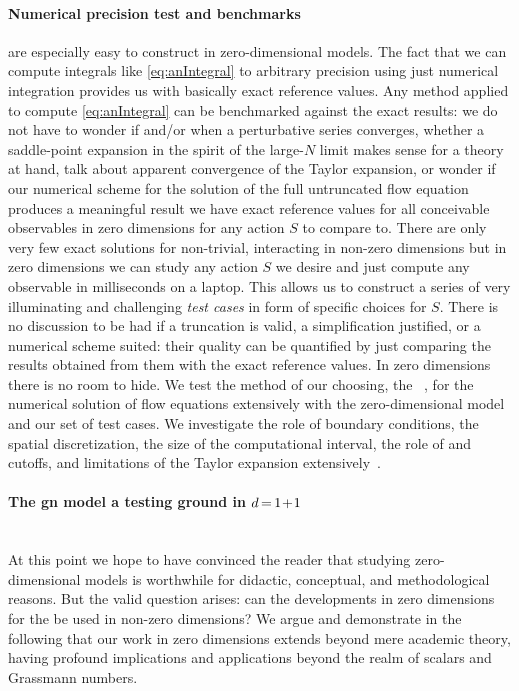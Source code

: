 \paragraph{Numerical precision test and benchmarks} are especially easy to construct in zero-dimensional models.
The fact that we can compute integrals like \eqref{eq:anIntegral} to arbitrary precision using just numerical integration provides us with basically exact reference values.
Any \qft{} method applied to compute \cref{eq:anIntegral} can be benchmarked against the exact results: we do not have to wonder if and/or when a perturbative series converges, whether a saddle-point expansion in the spirit of the large-$N$ limit makes sense for a theory at hand, talk about apparent convergence of the \frg{} Taylor expansion, or wonder if our numerical scheme for the solution of the full untruncated \frg{} flow equation produces a meaningful result \dash{} we have exact reference values for all conceivable observables in zero dimensions for any action $S$ to compare to.
There are only very few exact solutions for non-trivial, interacting \qfts{} in non-zero dimensions but in zero dimensions we can study any action $S$ we desire and just compute any observable in milliseconds on a laptop. 
This allows us to construct a series of very illuminating and challenging \textit{test cases} in form of specific choices for $S$.
There is no discussion to be had if a truncation is valid, a simplification justified, or a numerical scheme suited: their quality can be quantified by just comparing the results obtained from them with the exact reference values.
In zero dimensions there is no room to hide.
We test the \fv{} method of our choosing, \viz{} the \ktScheme{}~\cite{KTO2-0,KTO2-1}, for the numerical solution of \frg{} flow equations extensively with the zero-dimensional \ON{} model and our set of test cases.
We investigate the role of boundary conditions, the spatial discretization, the size of the computational interval, the role of \uv{} and \ir{} cutoffs, and limitations of the \frg{} Taylor expansion extensively~\cite{zerod1,zerod2,zerod3}.

\paragraph{The \acrlong{gn} model \dash{} a testing ground in $d\mkern-2mu=\mkern-2mu1\mkern-3mu+\mkern-3mu1$}\label{paragraph:introGN}\mbox{}\\%
At this point we hope to have convinced the reader that studying zero-dimensional models is worthwhile for didactic, conceptual, and methodological reasons.
But the valid question arises: can the developments in zero dimensions for the \frg{} be used in non-zero dimensions?
We argue and demonstrate in the following that our work in zero dimensions extends beyond mere academic theory, having profound implications and applications beyond the realm of scalars and Grassmann numbers.

